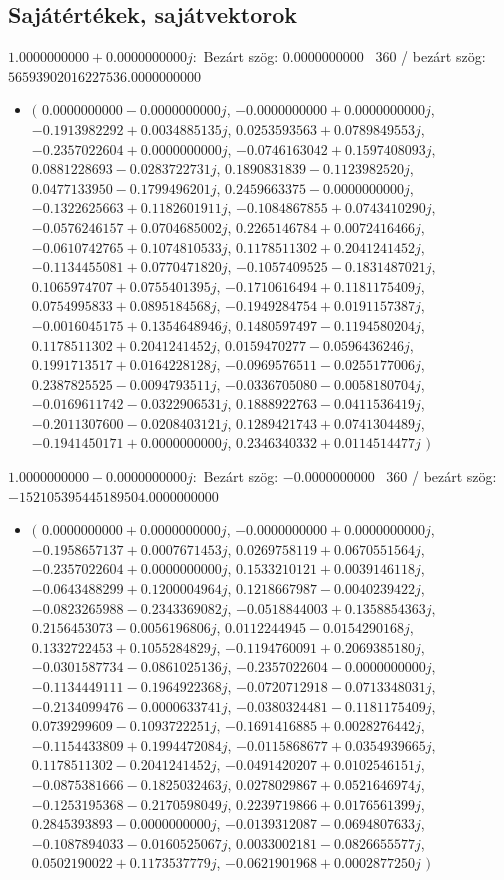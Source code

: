\documentclass[14pt,a4paper]{article}
\begin{document}
\subsection{Sajátértékek, sajátvektorok}
$1.0000000000+0.0000000000j$:\
Bezárt szög: $0.0000000000$ \
360 / bezárt szög: $56593902016227536.0000000000$\
\begin{itemize}
\item
$\big($
$0.0000000000-0.0000000000j$, $-0.0000000000+0.0000000000j$, $-0.1913982292+0.0034885135j$, $0.0253593563+0.0789849553j$, $-0.2357022604+0.0000000000j$, $-0.0746163042+0.1597408093j$, $0.0881228693-0.0283722731j$, $0.1890831839-0.1123982520j$, $0.0477133950-0.1799496201j$, $0.2459663375-0.0000000000j$, $-0.1322625663+0.1182601911j$, $-0.1084867855+0.0743410290j$, $-0.0576246157+0.0704685002j$, $0.2265146784+0.0072416466j$, $-0.0610742765+0.1074810533j$, $0.1178511302+0.2041241452j$, $-0.1134455081+0.0770471820j$, $-0.1057409525-0.1831487021j$, $0.1065974707+0.0755401395j$, $-0.1710616494+0.1181175409j$, $0.0754995833+0.0895184568j$, $-0.1949284754+0.0191157387j$, $-0.0016045175+0.1354648946j$, $0.1480597497-0.1194580204j$, $0.1178511302+0.2041241452j$, $0.0159470277-0.0596436246j$, $0.1991713517+0.0164228128j$, $-0.0969576511-0.0255177006j$, $0.2387825525-0.0094793511j$, $-0.0336705080-0.0058180704j$, $-0.0169611742-0.0322906531j$, $0.1888922763-0.0411536419j$, $-0.2011307600-0.0208403121j$, $0.1289421743+0.0741304489j$, $-0.1941450171+0.0000000000j$, $0.2346340332+0.0114514477j$
$\big)$
\end{itemize}
$1.0000000000-0.0000000000j$:\
Bezárt szög: $-0.0000000000$ \
360 / bezárt szög: $-152105395445189504.0000000000$\
\begin{itemize}
\item
$\big($
$0.0000000000+0.0000000000j$, $-0.0000000000+0.0000000000j$, $-0.1958657137+0.0007671453j$, $0.0269758119+0.0670551564j$, $-0.2357022604+0.0000000000j$, $0.1533210121+0.0039146118j$, $-0.0643488299+0.1200004964j$, $0.1218667987-0.0040239422j$, $-0.0823265988-0.2343369082j$, $-0.0518844003+0.1358854363j$, $0.2156453073-0.0056196806j$, $0.0112244945-0.0154290168j$, $0.1332722453+0.1055284829j$, $-0.1194760091+0.2069385180j$, $-0.0301587734-0.0861025136j$, $-0.2357022604-0.0000000000j$, $-0.1134449111-0.1964922368j$, $-0.0720712918-0.0713348031j$, $-0.2134099476-0.0000633741j$, $-0.0380324481-0.1181175409j$, $0.0739299609-0.1093722251j$, $-0.1691416885+0.0028276442j$, $-0.1154433809+0.1994472084j$, $-0.0115868677+0.0354939665j$, $0.1178511302-0.2041241452j$, $-0.0491420207+0.0102546151j$, $-0.0875381666-0.1825032463j$, $0.0278029867+0.0521646974j$, $-0.1253195368-0.2170598049j$, $0.2239719866+0.0176561399j$, $0.2845393893-0.0000000000j$, $-0.0139312087-0.0694807633j$, $-0.1087894033-0.0160525067j$, $0.0033002181-0.0826655577j$, $0.0502190022+0.1173537779j$, $-0.0621901968+0.0002877250j$
$\big)$
\end{itemize}
\end{document}
